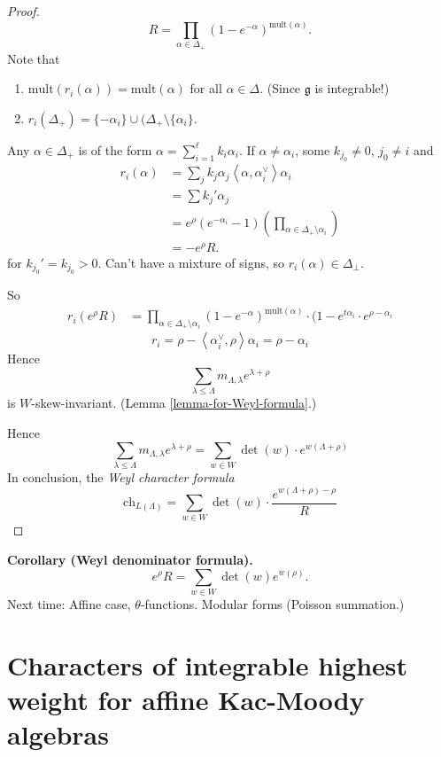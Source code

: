 \begin{proof}
$$
R=\prod_{\alpha \in
\Delta_+}(1-e^{-\alpha})^{\text{mult}(\alpha)
}.
$$
Note that
\begin{enumerate}
\item
$\text{mult}(r_i(\alpha))=\text{mult}(\alpha)
$
for all $\alpha \in \Delta$. (Since
$\mathfrak{g}$ is integrable!)
\item $r_i(\Delta_+)=\{-\alpha_i\}\cup
(\Delta_+\setminus\{\alpha_i\}$.
\end{enumerate}
Any $\alpha \in \Delta_+$ is of the form
$\alpha = \sum_{i=1}^\ell k_i \alpha_i$.
If $\alpha \neq \alpha_i$, some $k_{j_0}\neq
0$, $j_0 \neq  i$ and
$$
\begin{aligned}
r_i(\alpha)&=\sum_{j}k_j \alpha_j
\left\langle{}\alpha,\alpha_i^\vee\right\rangle{}\alpha_i\\
&=\sum k_j' \alpha_j\\
&=e^\rho(e^{-\alpha_i}-1)
\left(\prod_{\alpha \in \Delta_+ \setminus
\alpha_i}\right)\\
&=-e^\rho R.
\end{aligned}
$$
for $k_{j_0}'=k_{j_0}>0$. Can't have a
mixture of signs,
so $r_i(\alpha) \in \Delta_{\perp}$.

So
$$
\begin{aligned}
r_i(e^\rho R)&=\prod_{\alpha \in
\Delta_+\setminus \alpha_i}
(1-e^{-\alpha})^{\text{mult}(\alpha)}
\cdot (1-e^{t \alpha_i}\cdot
e^{\rho-\alpha_i}
\end{aligned}
$$
$$
r_i=\rho-\left\langle{}\alpha_i^\vee,
\rho\right\rangle{}\alpha_i=\rho-\alpha_i
$$
Hence
$$
\sum_{\lambda \leq
\Lambda}m_{\Lambda,\lambda}e^{\lambda+\rho}
$$
is $W$-skew-invariant. (Lemma
\ref{lemma-for-Weyl-formula}.)

Hence
$$
\sum_{\lambda \leq
\Lambda}m_{\Lambda,\lambda}e^{\lambda+\rho}
=\sum_{w \in W}\det(w)\cdot
e^{w(\Lambda+\rho)}
$$
In conclusion, the {\it Weyl character
formula}
$$
\text{ch}_{L(\Lambda)}=\sum_{w \in W}\det(w)
\cdot \frac{e^{w(\Lambda+\rho)-\rho}}{R}
$$
\end{proof}

\medskip\noindent
{\bf Corollary (Weyl denominator formula).}
$$
e^{\rho}R=\sum_{w \in W}\det(w)e^{w(\rho)}.
$$
Next time: Affine case, $\theta$-functions.
Modular forms (Poisson summation.)

\section{Characters of integrable highest
weight for affine Kac-Moody algebras}
\label{section-chara-integ-highe-weigh}

